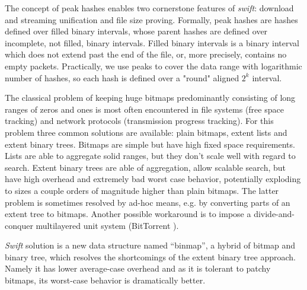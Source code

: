 The concept of peak hashes enables two cornerstone features of \emph{swift}: download and streaming unification and
file size proving. Formally, peak hashes are hashes defined over filled binary intervals, whose parent hashes are
defined over incomplete, not filled, binary intervals. Filled binary intervals is a binary interval which does not
extend past the end of the file, or, more precisely, contains no empty packets. Practically, we use peaks to cover the
data range with logarithmic number of hashes, so each hash is defined over a "round" aligned $2^k$ interval.

The classical problem of keeping huge bitmaps predominantly consisting of long ranges of zeros and ones is most often 
encountered in file systems (free space tracking) and network protocols (transmission progress tracking). For this
problem three common solutions are available: plain bitmaps, extent lists and extent binary trees. Bitmaps are simple
but have high fixed space requirements. Lists are able to aggregate solid ranges, but they don’t scale well with regard
to search. Extent binary trees are able of aggregation, allow scalable search, but have high overhead and extremely bad 
worst case behavior, potentially exploding to sizes a couple orders of magnitude higher than plain bitmaps. The latter
problem is sometimes resolved by ad-hoc means, e.g. by converting parts of an extent tree to bitmaps. Another possible
workaround is to impose a divide-and-conquer multilayered unit system (BitTorrent \cite{bittorrent}).

\emph{Swift} solution is a new data structure named “binmap”\cite{binmaps}, a hybrid of bitmap and binary tree, which
resolves the shortcomings of the extent binary tree approach. Namely it has lower average-case overhead and as it is
tolerant to patchy bitmaps, its worst-case behavior is dramatically better.



